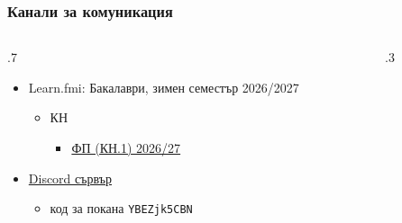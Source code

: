 \documentclass[alsotrans,beameroptions={aspectratio=169}]{beamerswitch}
\begin{document}
\begin{frame}
  \frametitle{Канали за комуникация}
          \begin{columns}[T,onlytextwidth]
            \begin{column}{.7\textwidth}
            \begin{itemize}
            \item Learn.fmi: Бакалаври, зимен семестър 2026/2027
              \begin{itemize}
              \item КН
                \begin{itemize}
                \item \href{https://learn.fmi.uni-sofia.bg/course/view.php?id=12580}{ФП (КН.1) 2026/27}
                \end{itemize}
              \end{itemize}
              \vspace{7ex}
            \item \href{https://discord.gg/YBEZjk5CBN}{Discord сървър}
              \begin{itemize}
              \item код за покана \tt{YBEZjk5CBN}
              \end{itemize}
            \end{itemize}
          \end{column}
          \begin{column}{.3\textwidth}

            \vspace{4ex}
          \end{column}
          \end{columns}
        \end{frame}
\end{document}
